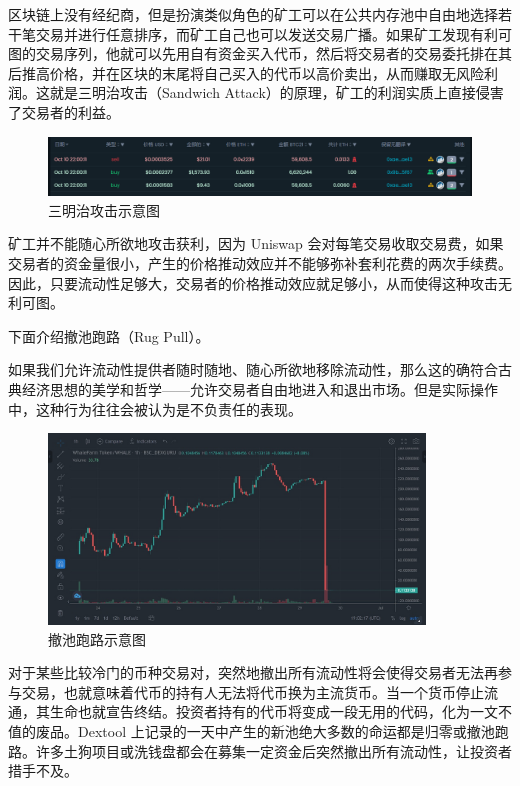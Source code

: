 \documentclass[12pt, a4paper, oneside]{ctexart}
\begin{document}
区块链上没有经纪商，但是扮演类似角色的矿工可以在公共内存池中自由地选择若干笔交易并进行任意排序，而矿工自己也可以发送交易广播。如果矿工发现有利可图的交易序列，他就可以先用自有资金买入代币，然后将交易者的交易委托排在其后推高价格，并在区块的末尾将自己买入的代币以高价卖出，从而赚取无风险利润。这就是三明治攻击（Sandwich Attack）的原理，矿工的利润实质上直接侵害了交易者的利益。

\begin{figure}[htbp]
    \centering
    \includegraphics[width=14cm]{三明治攻击示意图.png}
    \caption{三明治攻击示意图}
\end{figure}

矿工并不能随心所欲地攻击获利，因为 Uniswap 会对每笔交易收取交易费，如果交易者的资金量很小，产生的价格推动效应并不能够弥补套利花费的两次手续费。因此，只要流动性足够大，交易者的价格推动效应就足够小，从而使得这种攻击无利可图。

下面介绍撤池跑路（Rug Pull）。

如果我们允许流动性提供者随时随地、随心所欲地移除流动性，那么这的确符合古典经济思想的美学和哲学——允许交易者自由地进入和退出市场。但是实际操作中，这种行为往往会被认为是不负责任的表现。

\begin{figure}[htbp]
    \centering
    \includegraphics*[width=10cm]{rugpull.jpeg}
    \caption{撤池跑路示意图}
\end{figure}

对于某些比较冷门的币种交易对，突然地撤出所有流动性将会使得交易者无法再参与交易，也就意味着代币的持有人无法将代币换为主流货币。当一个货币停止流通，其生命也就宣告终结。投资者持有的代币将变成一段无用的代码，化为一文不值的废品。Dextool 上记录的一天中产生的新池绝大多数的命运都是归零或撤池跑路。许多土狗项目或洗钱盘都会在募集一定资金后突然撤出所有流动性，让投资者措手不及。
\end{document}
